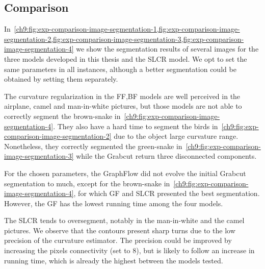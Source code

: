 \subsection{Comparison}

In~\cref{ch9:fig:exp-comparison-image-segmentation-1,fig:exp-comparison-image-segmentation-2,fig:exp-comparison-image-segmentation-3,fig:exp-comparison-image-segmentation-4} we show the segmentation results of several images for the three models developed in this thesis and the SLCR model. We opt to set the same parameters in all instances, although a better segmentation could be obtained by setting them separately.

The curvature regularization in the FF,BF models are well perceived in the airplane, camel and man-in-white pictures, but those models are not able to correctly segment the brown-snake in~\cref{ch9:fig:exp-comparison-image-segmentation-4}. They also have a hard time to segment the birds in~\cref{ch9:fig:exp-comparison-image-segmentation-2} due to the object large curvature range. Nonetheless, they correctly segmented the green-snake in~\cref{ch9:fig:exp-comparison-image-segmentation-3} while the Grabcut return three disconnected components.

For the chosen parameters, the GraphFlow did not evolve the initial Grabcut segmentation to much, except for the brown-snake in~\cref{ch9:fig:exp-comparison-image-segmentation-4}, for which GF and SLCR presented the best segmentation. However, the GF has the lowest running time among the four models.

The SLCR tends to oversegment, notably in the man-in-white and the camel pictures. We observe that the contours present sharp turns due to the low precision of the curvature estimator. The precision could be improved by increasing the pixels connectivity (set to $8$), but is likely to follow an increase in running time, which is already the highest between the models tested.





\newcommand\segComparisonGF[2]{figures/chapter9/segmentation/comparison/#1/#2/alpha-0.0002/beta-1.0/gamma-3.0/radius-7}
\newcommand\segComparisonFF[2]{figures/chapter9/segmentation/comparison/#1/#2/alpha-0.5/beta-1.0/gamma-3.0/radius-7}
\newcommand\segComparisonScho[2]{figures/chapter9/segmentation/comparison/#1/lambda-2.0/gamma-1.0/#2}

